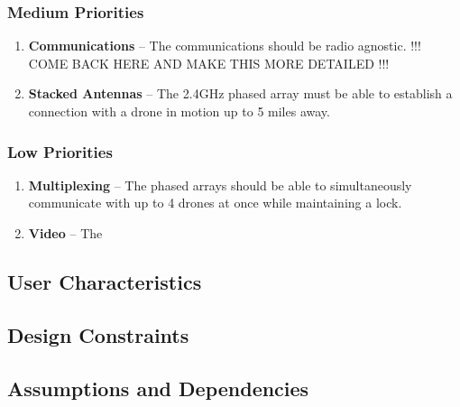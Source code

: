 \documentclass[ProjectRequirements.tex]{subfiles}
\begin{document}
		\subsubsection{Medium Priorities}
			\begin{enumerate}
				\item \textbf{Communications} -- The communications should be radio agnostic. !!! COME BACK HERE AND MAKE THIS MORE DETAILED !!!
				\item \textbf{Stacked Antennas} -- The 2.4GHz phased array must be able to establish a connection with a drone in motion up to 5 miles away.
			\end{enumerate}
		
		\subsubsection{Low Priorities}
			\begin{enumerate}
				\item \textbf{Multiplexing} -- The phased arrays should be able to simultaneously communicate with up to 4 drones at once while maintaining a lock.
				\item \textbf{Video} -- The 
			\end{enumerate}
		
	\subsection{User Characteristics}
	
	\subsection{Design Constraints}
	
	\subsection{Assumptions and Dependencies}
	
\end{document}
